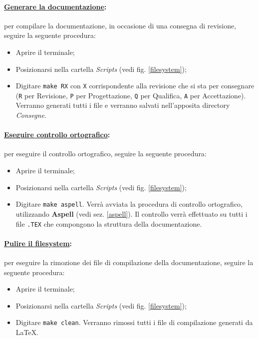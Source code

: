 \paragraph{\underline{Generare la documentazione}:} per compilare la documentazione, in occasione di una consegna di revisione, seguire la seguente procedura:
\begin{itemize}
\item Aprire il terminale;
\item Posizionarsi nella cartella \textit{Scripts} (vedi fig. \ref{filesystem});
\item Digitare \verb!make RX! con \verb!X! corrispondente alla revisione che si sta per consegnare (\verb!R! per Revisione, \verb!P! per Progettazione, \verb!Q! per Qualifica, \verb!A! per Accettazione). Verranno generati tutti i file e verranno salvati nell'apposita directory \textit{Consegne}.
\end{itemize}

\paragraph{\underline{Eseguire controllo ortografico}:} per eseguire il controllo ortografico, seguire la seguente procedura:
\begin{itemize}
\item Aprire il terminale;
\item Posizionarsi nella cartella \textit{Scripts} (vedi fig. \ref{filesystem});
\item Digitare \verb!make aspell!. Verrà avviata la procedura di controllo ortografico, utilizzando \textbf{Aspell} (vedi sez. \ref{aspell}). Il controllo verrà effettuato su tutti i file \verb!.TEX! che compongono la struttura della documentazione.
\end{itemize}

\paragraph{\underline{Pulire il filesystem}:} per eseguire la rimozione dei file di compilazione della documentazione, seguire la seguente procedura:
\begin{itemize}
\item Aprire il terminale;
\item Posizionarsi nella cartella \textit{Scripts} (vedi fig. \ref{filesystem});
\item Digitare \verb!make clean!. Verranno rimossi tutti i file di compilazione generati da \LaTeX.
\end{itemize}